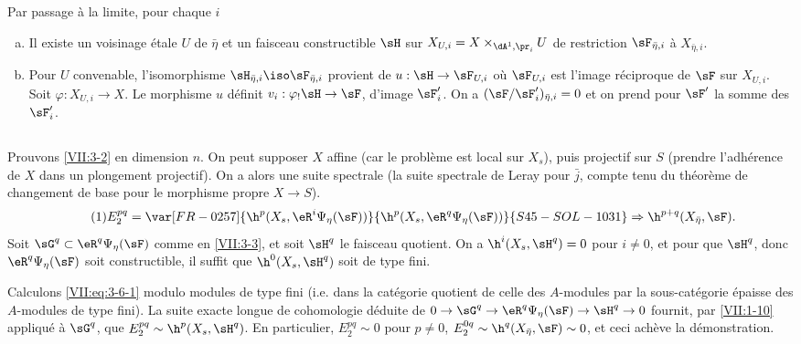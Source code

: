 Par passage à la limite, pour chaque $i$
\begin{enumerate}[a)]
  \item Il existe un voisinage étale $U$ de $\bar\eta$ et un faisceau 
    constructible $\sH$ sur $X_{U,i} = X\times_{\dA^1,\pr_i} U$ de restriction 
    $\sF_{\bar\eta,i}$ à $X_{\bar\eta,i}$. 
  \item Pour $U$ convenable, l'isomorphisme 
    $\sH_{\bar\eta,i} \iso \sF_{\bar\eta,i}$ provient de $u:\sH\to \sF_{U,i}$ 
    où $\sF_{U,i}$ est l'image réciproque de $\sF$ sur $X_{U,i}$. Soit 
    $\varphi:X_{U,i} \to X$. Le morphisme $u$ définit 
    $v_i:\varphi_! \sH \to \sF$, d'image $\sF_i'$. On a 
    $(\sF/\sF_i')_{\bar\eta,i} = 0$ et on prend pour $\sF'$ la somme des 
    $\sF_i'$. 
\end{enumerate}





\subsection{}\label{VII:3-6}

Prouvons \ref{VII:3-2} en dimension $n$. On peut supposer $X$ affine (car le 
problème est local sur $X_s$), puis projectif sur $S$ (prendre l'adhérence 
de $X$ dans un plongement projectif). On a alors une suite spectrale 
 (la suite spectrale de Leray pour $\bar j$, compte tenu du 
théorème de changement de base pour le morphisme propre $X\to S$). 
\begin{equation*}\tag{1}\label{VII:eq:3-6-1}
  E_2^{p q} = \var[FR-0257]{\h^p(X_s,\eR^i\Psi_\eta(\sF))}{\h^p(X_s,\eR^q\Psi_\eta(\sF))}{S45-SOL-1031} \Rightarrow \h^{p+q}(X_{\bar\eta},\sF) \text{.} 
\end{equation*}
Soit $\sG^q\subset \eR^q \Psi_\eta(\sF)$ comme en \ref{VII:3-3}, et soit 
$\sH^q$ le faisceau quotient. On a $\h^i(X_s,\sH^q)=0$ pour $i\ne 0$, et pour 
que $\sH^q$, donc $\eR^q\Psi_\eta(\sF)$ soit constructible, il suffit que 
$\h^0(X_s,\sH^q)$ soit de type fini. 

Calculons \eqref{VII:eq:3-6-1} modulo modules de type fini (i.e. dans la 
catégorie quotient de celle des $A$-modules par la sous-catégorie épaisse 
des $A$-modules de type fini). La suite exacte longue de cohomologie déduite 
de $0 \to \sG^q \to \eR^q\Psi_\eta(\sF) \to \sH^q \to 0$ fournit, par 
\ref{VII:1-10} appliqué à $\sG^q$, que $E_2^{p q} \sim \h^p(X_s,\sH^q)$. 
En particulier, $E_2^{p q}\sim 0$ pour $p\ne 0$, 
$E_2^{0 q}\sim \h^q(X_{\bar\eta},\sF) \sim 0$, et ceci achève la 
démonstration. 

